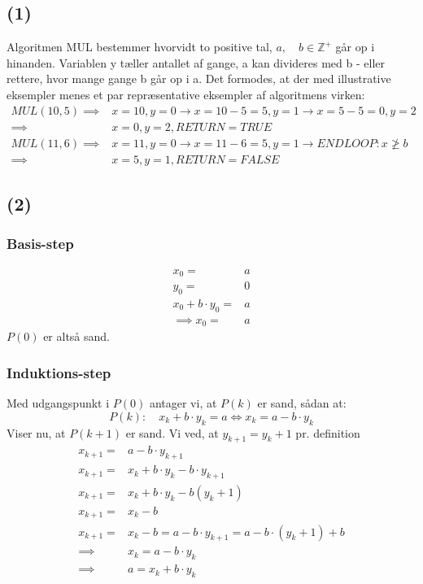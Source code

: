 \documentclass[a4paper,10pt]{article}
\begin{document}
\subsection*{(1)}
Algoritmen MUL bestemmer hvorvidt to positive tal, $a,\quad b \in \mathbb Z^{+}$ går op i hinanden. Variablen y tæller antallet af gange, a kan divideres med b - eller rettere, hvor mange gange b går op i a. Det formodes, at der med illustrative eksempler menes et par repræsentative eksempler af algoritmens virken:
\begin{equation}
\begin{aligned}	
MUL(10, 5)		\implies	& x = 10, y = 0 \rightarrow x = 10-5 = 5, y = 1 \rightarrow  x = 5-5 = 0, y = 2 \\
				\implies	& x = 0, y = 2, RETURN = TRUE \\
MUL(11, 6)		\implies 	& x = 11, y = 0 \rightarrow  x = 11-6 = 5, y = 1 \rightarrow END LOOP: x \ngeq b \\
				\implies	& x = 5, y = 1, RETURN = FALSE
\end{aligned}
\end{equation}

\subsection*{(2)}
\subsubsection*{Basis-step}
\begin{equation}
\begin{aligned}	
x_{0} 					= & a \\
y_{0}					= & 0 \\
x_{0} +b\cdot y_{0} 	= & a \\
\implies x_{0} 			= & a
\end{aligned}
\end{equation}
$P(0)$ er altså sand. 

\subsubsection*{Induktions-step}
Med udgangspunkt i $P(0)$ antager vi, at $P(k)$ er sand, sådan at:
$$
P(k): \quad x_{k} + b \cdot y_{k} = a \iff x_{k} = a - b \cdot y_{k}
$$
Viser nu, at $P(k+1)$ er sand. Vi ved, at $y_{k+1} = y_{k} + 1$ pr. definition
\begin{equation}
\begin{aligned}	
x_{k+1} = & a - b \cdot y_{k+1} \\
x_{k+1} = & x_{k} + b \cdot y_{k} - b \cdot y_{k+1} \\
x_{k+1} = & x_{k} + b \cdot y_{k} - b(y_{k} + 1) \\
x_{k+1} = & x_{k} - b \\
x_{k+1} = & x_{k} - b = a - b \cdot y_{k+1} = a - b \cdot (y_{k} + 1) + b \\
\implies  & x_{k} = a - b \cdot y_{k} \\
\implies  & a = x_{k} + b\cdot y_{k}
\end{aligned}
\end{equation}
\end{document}
